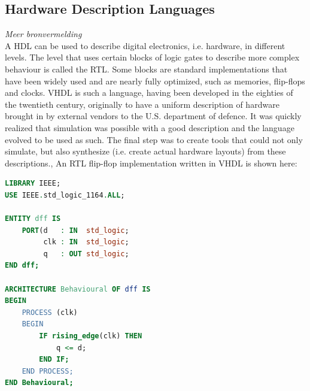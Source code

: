 \documentclass[11pt,british]{article}
\begin{document}
%

\subsection{Hardware Description Languages}
\label{subsec:HDL}
\emph{\color{red}Meer bronvermelding}\\
A \gls{HDL} can be used to describe digital electronics, i.e. hardware, in different levels. The level that uses certain blocks of logic gates to describe more complex behaviour is called the \gls{RTL}. Some blocks are standard implementations that have been widely used and are nearly fully optimized, such as memories, flip-flops and clocks. \gls{VHDL} is such a language, having been developed in the eighties of the twentieth century, originally to have a uniform description of hardware brought in by external vendors to the U.S. department of defence. It was quickly realized that simulation was possible with a good description and the language evolved to be used as such.\cite{vhdlorigin,vhdlorigin2} The final step was to create tools that could not only simulate, but also synthesize (i.e. create actual hardware layouts) from these descriptions.\cite{vhdlsim,vhdlsynth,vhdlsynth2},\cite{vhdlsynth3} An \gls{RTL} flip-flop implementation written in \gls{VHDL} is shown here: 
\begin{lstlisting}[language=VHDL, tabsize=4, frame=single, framesep=2mm, belowskip=16pt, aboveskip=16pt, showstringspaces=false, basicstyle=\footnotesize]
LIBRARY IEEE;
USE IEEE.std_logic_1164.ALL;

ENTITY dff IS
	PORT(d 	 : IN  std_logic;
		 clk : IN  std_logic;
		 q 	 : OUT std_logic;
END dff;

ARCHITECTURE Behavioural OF dff IS
BEGIN
	PROCESS (clk)
	BEGIN
		IF rising_edge(clk) THEN
			q <= d;
		END IF;
	END PROCESS;
END Behavioural;
\end{lstlisting}
\end{document}
